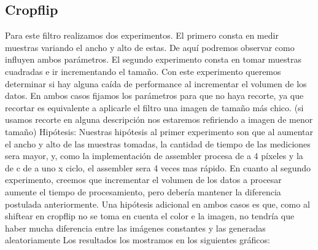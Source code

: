 \subsection{Cropflip}
\hfill \break
Para este filtro realizamos dos experimentos. El primero consta en medir muestras variando el ancho y alto de estas. De aquí podremos observar como influyen ambos parámetros. El segundo experimento consta en tomar muestras cuadradas e ir incrementando el tamaño. Con este experimento queremos determinar si hay alguna caída de performance al incrementar el volumen de los datos. En ambos casos fijamos los parámetros para que no haya recorte, ya que recortar es equivalente a aplicarle el filtro una imagen de tamaño más chico. (si usamos recorte en alguna descripción nos estaremos refiriendo a imagen de menor tamaño)
\hfill \break
Hipótesis: Nuestras hipótesis al primer experimento son que al aumentar el ancho y alto de las muestras tomadas, la cantidad de tiempo de las mediciones sera mayor, y, como la implementación de assembler procesa de a 4 píxeles y la de c de a uno x ciclo,  el assembler sera 4 veces mas rápido.
En cuanto al segundo experimento, creemos que incrementar el volumen de los datos a procesar aumente el tiempo de procesamiento, pero debería mantener la diferencia postulada anteriormente. 
Una hipótesis adicional en ambos casos es que, como al shiftear en cropflip no se toma en cuenta el color e la imagen, no tendría que haber mucha diferencia entre las imágenes constantes y las generadas aleatoriamente
\hfill \break
 Los resultados los mostramos en los siguientes gráficos:
 
 
 
